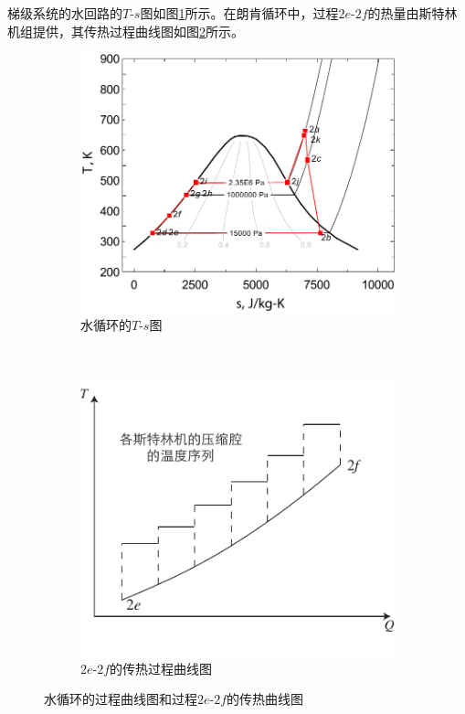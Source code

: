 梯级系统的水回路的$T$-$s$图如图\ref{fig:T-s_Water2}所示。在朗肯循环中，过程$2e$-$2f$的热量由斯特林机组提供，其传热过程曲线图如图\ref{fig:HeatTransfer_Water-SEs}所示。

\noindent \begin{figure}[htbp]
\centering
	\begin{subfigure}[b]{0.45\columnwidth}
	\includegraphics[width = \columnwidth]{fig/T-s_Water2}
	\caption{水循环的$T$-$s$图}\label{fig:T-s_Water2}
	\end{subfigure}
	~
\begin{subfigure}[b]{0.45\columnwidth}
	\includegraphics[width = \columnwidth]{fig/HeatTransfer_Water-SEs}
	\caption{$2e$-$2f$的传热过程曲线图}
	\label{fig:HeatTransfer_Water-SEs}
	\end{subfigure}
	
	\caption{水循环的过程曲线图和过程$2e$-$2f$的传热曲线图}\label{fig:Diagrams$2e$-$2f$}
\end{figure}

